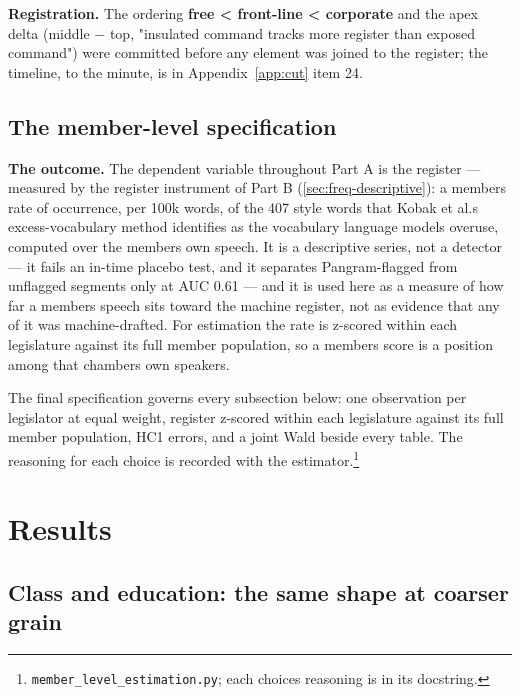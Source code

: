 \textbf{Registration.} The ordering \textbf{free \textless{} front-line \textless{} corporate} and the
apex delta (middle \(-\) top, "insulated command tracks more register than
exposed command") were committed before any element was joined to the
register; the timeline, to the minute, is in Appendix~\ref{app:cut}
item 24.

\subsection{The member-level specification}\label{sec:member-spec}

\textbf{The outcome.} The dependent variable throughout Part A is the register --- measured by
the register instrument of Part B (\cref{sec:freq-descriptive}): a member\textquotesingle s rate of occurrence, per 100k words,
of the 407 style words that Kobak et al.\textquotesingle s excess-vocabulary method identifies
as the vocabulary language models overuse, computed over the member\textquotesingle s own
speech. It is a descriptive series, not a detector --- it fails an in-time
placebo test, and it separates Pangram-flagged from unflagged segments only at
AUC 0.61 --- and it is used here as a measure of how far a member\textquotesingle s speech sits
toward the machine register, not as evidence that any of it was
machine-drafted. For estimation the rate is z-scored within each legislature
against its full member population, so a member\textquotesingle s score is a position among
that chamber\textquotesingle s own speakers.

The final specification governs every subsection below: one observation per legislator
at equal weight, register z-scored within each legislature against its full
member population, HC1 errors, and a joint Wald beside every table. The
reasoning for each choice is recorded with the estimator.\footnote{\texttt{member\_\allowbreak{}level\_\allowbreak{}estimation.\allowbreak{}py}; each choice\textquotesingle s reasoning is in its
  docstring.}

\section{Results}\label{sec:a-results}

\subsection{Class and education: the same shape at coarser grain}\label{sec:class}

